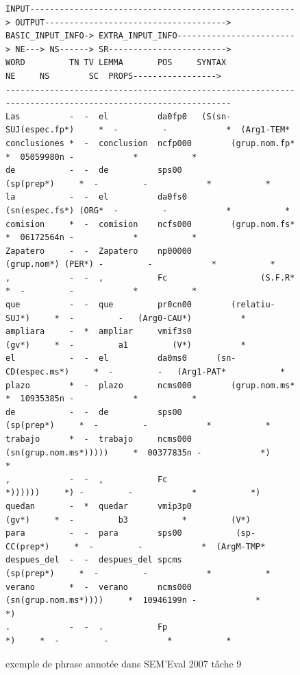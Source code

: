 \documentclass[12pt,a4paper,times,twoside,openright]{report}
\begin{document}
\begin{figure}[ht!]
\center
\scriptsize
\begin{verbatim}
INPUT------------------------------------------------------> OUTPUT------------------------------------->
BASIC_INPUT_INFO-> EXTRA_INPUT_INFO------------------------> NE---> NS------> SR------------------------>
WORD         TN TV LEMMA       POS     SYNTAX                NE     NS        SC  PROPS----------------->
---------------------------------------------------------------------------------------------------------
Las          -  -  el          da0fp0   (S(sn-SUJ(espec.fp*)     *  -         -            *  (Arg1-TEM*
conclusiones *  -  conclusion  ncfp000        (grup.nom.fp*      *  05059980n -            *           *
de           -  -  de          sps00              (sp(prep*)     *  -         -            *           *
la           -  -  el          da0fs0         (sn(espec.fs*) (ORG*  -         -            *           *
comision     *  -  comision    ncfs000        (grup.nom.fs*      *  06172564n -            *           *
Zapatero     -  -  Zapatero    np00000           (grup.nom*) (PER*) -         -            *           *
,            -  -  ,           Fc                   (S.F.R*      *  -         -            *           *
que          -  -  que         pr0cn00        (relatiu-SUJ*)     *  -         -   (Arg0-CAU*)          *
ampliara     -  *  ampliar     vmif3s0                 (gv*)     *  -         a1         (V*)          *
el           -  -  el          da0ms0      (sn-CD(espec.ms*)     *  -         -   (Arg1-PAT*           *
plazo        *  -  plazo       ncms000        (grup.nom.ms*      *  10935385n -            *           *
de           -  -  de          sps00              (sp(prep*)     *  -         -            *           *
trabajo      *  -  trabajo     ncms000 (sn(grup.nom.ms*)))))     *  00377835n -            *)          *
,            -  -  ,           Fc                    *))))))     *) -         -            *           *)
quedan       -  *  quedar      vmip3p0                 (gv*)     *  -         b3           *         (V*)
para         -  -  para        sps00           (sp-CC(prep*)     *  -         -            *  (ArgM-TMP*
despues_del  -  -  despues_del spcms              (sp(prep*)     *  -         -            *           *
verano       *  -  verano      ncms000  (sn(grup.nom.ms*))))     *  10946199n -            *           *)
.            -  -  .           Fp                         *)     *  -         -            *           *\end{verbatim}
\caption{exemple de phrase annotée dans SEM'Eval 2007 tâche 9}
\label{fig:semeval2007-example}
\end{figure}
\end{document}
